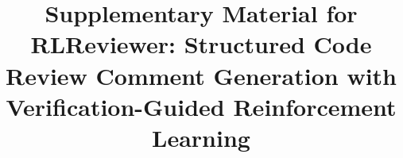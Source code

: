 \documentclass[acmsmall,screen,nonacm]{acmart}
\begin{document}
\title{Supplementary Material for RLReviewer: Structured Code Review Comment
Generation with Verification-Guided Reinforcement Learning}

\maketitle


\end{document}
